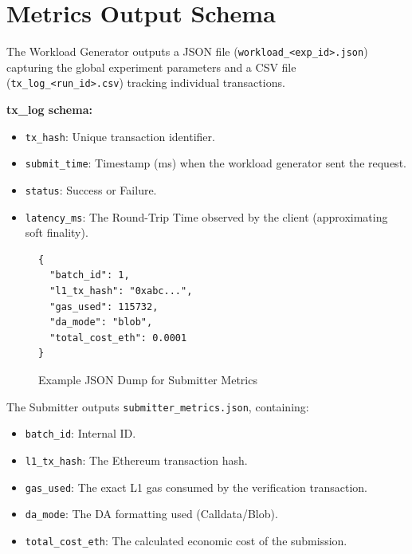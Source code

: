 \chapter{Metrics Output Schema}
\label{app:metrics_schema}
The Workload Generator outputs a JSON file (\texttt{workload\_<exp\_id>.json}) capturing the global experiment parameters and a CSV file (\texttt{tx\_log\_<run\_id>.csv}) tracking individual transactions.

\textbf{tx\_log schema:}
\begin{itemize}
    \item \texttt{tx\_hash}: Unique transaction identifier.
    \item \texttt{submit\_time}: Timestamp (ms) when the workload generator sent the request.
    \item \texttt{status}: Success or Failure.
    \item \texttt{latency\_ms}: The Round-Trip Time observed by the client (approximating soft finality).
\end{itemize}

\begin{figure}[H]
    \centering
\begin{lstlisting}[style=yamlStyle]
{
  "batch_id": 1,
  "l1_tx_hash": "0xabc...",
  "gas_used": 115732,
  "da_mode": "blob",
  "total_cost_eth": 0.0001
}
\end{lstlisting}
    \caption{Example JSON Dump for Submitter Metrics}
\end{figure}

The Submitter outputs \texttt{submitter\_metrics.json}, containing:
\begin{itemize}
    \item \texttt{batch\_id}: Internal ID.
    \item \texttt{l1\_tx\_hash}: The Ethereum transaction hash.
    \item \texttt{gas\_used}: The exact L1 gas consumed by the verification transaction.
    \item \texttt{da\_mode}: The DA formatting used (Calldata/Blob).
    \item \texttt{total\_cost\_eth}: The calculated economic cost of the submission.
\end{itemize}